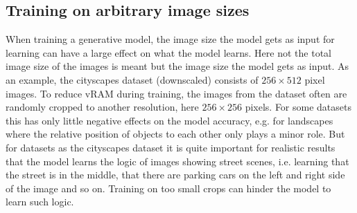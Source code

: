 \subsection{Training on arbitrary image sizes} %
When training a generative model, the image size the model gets as input for learning can have a large effect on what the model learns. Here not the total image size of the images is meant but the image size the model gets as input. As an example, the cityscapes dataset (downscaled) consists of $256\times512$ pixel images. To reduce vRAM during training, the images from the dataset often are randomly cropped to another resolution, here $256\times256$ pixels. For some datasets this has only little negative effects on the model accuracy, e.g. for landscapes where the relative position of objects to each other only plays a minor role. But for datasets as the cityscapes dataset it is quite important for realistic results that the model learns the logic of images showing street scenes, i.e. learning that the street is in the middle, that there are parking cars on the left and right side of the image and so on. Training on too small crops can hinder the model to learn such logic.

